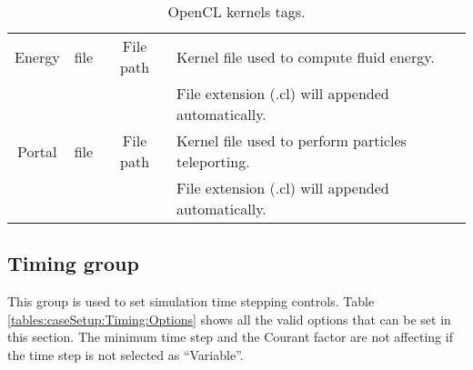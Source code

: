 \begin{table}[h!b!p!]
\begin{tabular}{| c | c | c | l | }
		\hline
		Energy            & file & File path & Kernel file used to compute 
		fluid energy. \\
		                  &      &           & File extension (.cl) will 
		                  appended automatically. \\
		\hline
		Portal            & file & File path & Kernel file used to perform particles teleporting. \\
		                  &      &           & File extension (.cl) will appended automatically. \\
		\hline
	\end{tabular}
	\caption{OpenCL kernels tags.}
	\label{tables:caseSetup:OpenCL:Options}
\end{table}
%
\subsection{Timing group}
\label{sss:XML:Timing}
%
This group is used to set simulation time stepping controls. Table
\ref{tables:caseSetup:Timing:Options} shows all the valid options
that can be set in this section.\rc
%
The minimum time step and the Courant factor are not affecting if the time 
step is not selected as ``Variable''.
%
